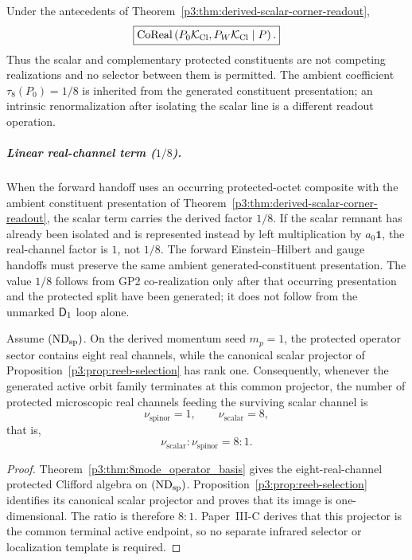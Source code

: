 \documentclass[12pt,a4paper]{article}
\begin{document}
\begin{corollary}
\label{p3b:cor:protected-split-corealization}
Under the antecedents of
Theorem~\ref{p3:thm:derived-scalar-corner-readout},
\[
 \boxed{
 \operatorname{CoReal}
 \left(
 P_0\mathcal K_{\rm Cl},
 P_W\mathcal K_{\rm Cl}
 \mid P
 \right).}
\]
Thus the scalar and complementary protected constituents are not competing
realizations and no selector between them is permitted.  The ambient
coefficient \(\tau_8(P_0)=1/8\) is inherited from the generated constituent
presentation; an intrinsic renormalization after isolating the scalar line is
a different readout operation.
\end{corollary}

\subparagraph{\texorpdfstring{Linear real-channel term ($1/8$).}{Linear real-channel term (1/8).}}
When the forward handoff uses an occurring protected-octet composite with the
ambient constituent presentation of
Theorem~\ref{p3:thm:derived-scalar-corner-readout}, the scalar term carries
the derived factor \(1/8\).  If the scalar remnant has already been isolated
and is represented instead by left multiplication by \(a_0\mathbf1\), the
real-channel factor is \(1\), not \(1/8\).  The forward Einstein--Hilbert and
gauge handoffs must preserve the same ambient generated-constituent
presentation.  The value \(1/8\) follows from GP2 co-realization only after
that occurring presentation and the protected split have been generated; it
does not follow from the unmarked \(\mathsf{D}_1\) loop alone.

\begin{proposition}
\label{p3:prop:kinematic-sector-weight}
Assume \((\mathrm{ND}_{\rm sp})\).  On the derived momentum seed \(m_p=1\),
the protected operator sector contains eight real channels, while the
canonical scalar projector of
Proposition~\ref{p3:prop:reeb-selection} has rank one.  Consequently, whenever
the generated active orbit family terminates at this common projector, the number of
protected microscopic real channels feeding the surviving scalar channel is
\[
\nu_{\mathrm{spinor}}=1,\qquad \nu_{\mathrm{scalar}}=8,
\]
that is,
\[
\nu_{\mathrm{scalar}}:\nu_{\mathrm{spinor}}=8:1.
\]
\end{proposition}

\begin{proof}
Theorem~\ref{p3:thm:8mode_operator_basis} gives the eight-real-channel
protected Clifford algebra on \((\mathrm{ND}_{\rm sp})\).
Proposition~\ref{p3:prop:reeb-selection} identifies its canonical scalar
projector and proves that its image is one-dimensional.  The ratio is
therefore \(8:1\).  Paper~III-C derives that this projector is the common
terminal active endpoint, so no separate infrared selector or localization template is
required.
\end{proof}
\end{document}
